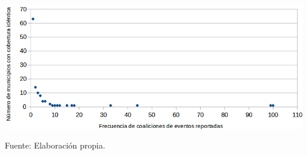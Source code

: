 \documentclass[letterpaper, 11pt]{book}
\theoremstyle{definition}
\theoremstyle{remark}
\begin{document}
\hspace{-1em}\begin{minipage}{\linewidth}
\centering
{} \label{3.7_epsMunicipiosfreq}
\hspace{-1.5em}\includegraphics[scale=0.54]{img/3.7_epsMunicipiosfreq.png}
\par\bigskip
\small Fuente: Elaboración propia.
\end{minipage}\bigskip
\end{document}
